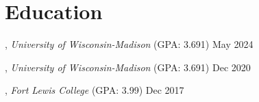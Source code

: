 \section{Education}

, \textit{University of Wisconsin-Madison} (GPA: 3.691) \hfill May 2024

, \textit{University of Wisconsin-Madison} (GPA: 3.691) \hfill Dec 2020

, \textit{Fort Lewis College} (GPA: 3.99) \hfill	Dec 2017